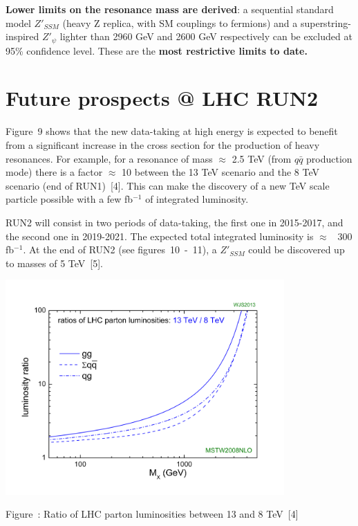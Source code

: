 \documentclass[a0b,portrait,preview]{a0poster}
\begin{document}
\begin{multicols}{3}
\textbf{Lower limits on the resonance mass are derived}: a sequential standard model $Z'_{SSM}$ (heavy Z replica, with SM couplings to fermions) and a superstring-inspired $Z'_\psi$ lighter than 2960 GeV and 
2600 GeV respectively can be excluded at 95\% confidence level. These are the \textbf{most restrictive limits to date.}

\vspace{1,5cm}

{\red \section{\bf Future prospects @ LHC RUN2}}
\vspace*{0.cm}
{\darkgreen Figure~9} shows that the new data-taking at high energy is expected to benefit from a significant increase in the cross section for the production of heavy resonances. For example,
for a resonance of mass $\approx$ 2.5 TeV (from $q\bar{q}$ production mode) there is a factor $\approx$ 10 between the 13 TeV scenario and the 8 TeV scenario (end of RUN1)~[4].
This can make the discovery of a new TeV scale particle possible with a few fb$^{-1}$ of integrated luminosity.

RUN2 will consist in two periods of data-taking, the first one in 2015-2017, and the second one in 2019-2021. The expected total integrated luminosity is $\approx$~ 300 fb$^{-1}$.
At the end of RUN2 (see {\darkgreen figures~10~-~11}), a $Z'_{SSM}$ could be discovered up to masses of 5 TeV~[5].

\begin{minipage}{\figwidth}
\unitlength=1cm
\begin{center}
{\includegraphics[width= 0.8\textwidth]{figure/lumi_scale.jpg}}%
\newline
\addtocounter{figscount}{1}
{\small \captcolor Figure~: Ratio of LHC parton luminosities between 13 and 8 TeV~[4]} %
\end{center}
\label{fig:limit}
\vspace{1.5cm}
\end{minipage}


\end{multicols}
\end{document}
